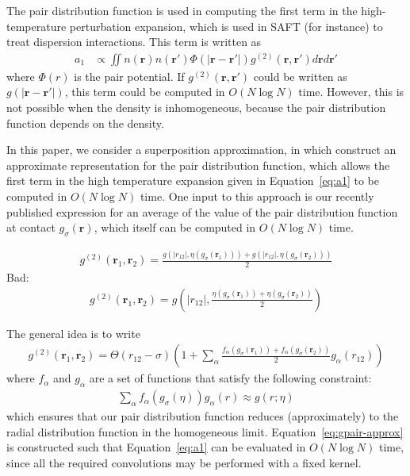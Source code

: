 \documentclass[letterpaper,twocolumn,amsmath,amssymb,pre,aps,10pt]{revtex4-1}
\newcommand{\rr}{\textbf{r}}
\begin{document}
The pair distribution function is used in computing the first term in
the high-temperature perturbation expansion, which is used in SAFT
(for instance) to treat dispersion interactions.  This term is written
as
\begin{align}\label{eq:a1}
  a_1 &\propto \iint n(\rr)n(\rr') \Phi(|\rr-\rr'|)
  g^{(2)}(\rr,\rr')d\rr d\rr'
\end{align}
where $\Phi(r)$ is the pair potential.  If $g^{(2)}(\rr,\rr')$ could
be written as $g(|\rr-\rr'|)$, this term could be computed in $O(N\log
N)$ time.  However, this is not possible when the density is
inhomogeneous, because the pair distribution function depends on the
density.

In this paper, we consider a superposition approximation, in which
construct an approximate representation for the pair distribution
function, which allows the first term in the high temperature
expansion given in Equation~\ref{eq:a1} to be computed in $O(N\log N)$
time.  One input to this approach is our recently published expression
for an average of the value of the pair distribution function at
contact $g_\sigma(\rr)$, which itself can be computed in $O(N\log N)$
time.

\begin{align}
  g^{(2)}(\rr_1,\rr_2) = \frac{g(|r_{12}|, \eta(g_\sigma(\rr_1))) + g(|r_{12}|, \eta(g_\sigma(\rr_2)))}{2}
\end{align}
Bad:
\begin{align}
  g^{(2)}(\rr_1,\rr_2) = g\left(|r_{12}|, \frac{\eta(g_\sigma(\rr_1)) + \eta(g_\sigma(\rr_2))}{2}\right)
\end{align}

The general idea is to write
\begin{align}
  g^{(2)}(\rr_1,\rr_2) = \Theta(r_{12}-\sigma)
  \left(1 + \sum_{\alpha} \frac{f_{\alpha}(g_\sigma(\rr_1)) + f_{\alpha}(g_\sigma(\rr_2))}{2}g_{\alpha}(r_{12})\right)\label{eq:gpair-approx}
\end{align}
where $f_{\alpha}$ and $g_{\alpha}$ are a set of functions that
satisfy the following constraint:
\begin{align}\label{eq:definealpha}
  \sum_{\alpha} f_{\alpha}(g_\sigma(\eta)) g_{\alpha}(r) \approx g(r; \eta)
\end{align}
which ensures that our pair distribution function reduces
(approximately) to the radial distribution function in the homogeneous
limit.  Equation~\ref{eq:gpair-approx} is constructed such that
Equation~\ref{eq:a1} can be evaluated in $O(N\log N)$ time, since all
the required convolutions may be performed with a fixed kernel.
\end{document}

